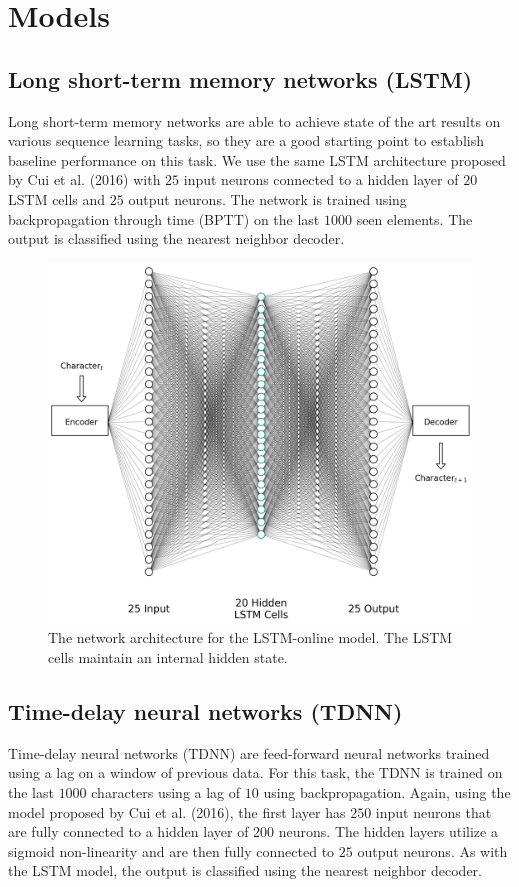 \documentclass{article}
\begin{document}
\section*{Models}

\subsection*{Long short-term memory networks (LSTM)}

Long short-term memory \cite{hochreiter1997long} networks are able to achieve state of the art results on various sequence learning tasks, so they are a good starting point to establish baseline performance on this task. We use the same LSTM architecture proposed by Cui et al. (2016) with $25$ input neurons connected to a hidden layer of $20$ LSTM cells and $25$ output neurons. The network is trained using backpropagation through time (BPTT) \cite{mozer1995focused} on the last $1000$ seen elements. The output is classified using the nearest neighbor decoder.

\begin{figure}[!h]
    \centering
    \includegraphics[width=0.75\linewidth]{lstm.png}
    \caption{The network architecture for the LSTM-online model. The LSTM cells maintain an internal hidden state.}
    \label{fig:lstm-online-model}
\end{figure}

\subsection*{Time-delay neural networks (TDNN)}

Time-delay neural networks (TDNN) are feed-forward neural networks trained using a lag on a window of previous data. \cite{waibel1995phoneme} For this task, the TDNN is trained on the last $1000$ characters using a lag of $10$ using backpropagation. \cite{rojas1996backpropagation} Again, using the model proposed by Cui et al. (2016), the first layer has $250$ input neurons that are fully connected to a hidden layer of $200$ neurons. The hidden layers utilize a sigmoid non-linearity and are then fully connected to $25$ output neurons. As with the LSTM model, the output is classified using the nearest neighbor decoder.
\end{document}
